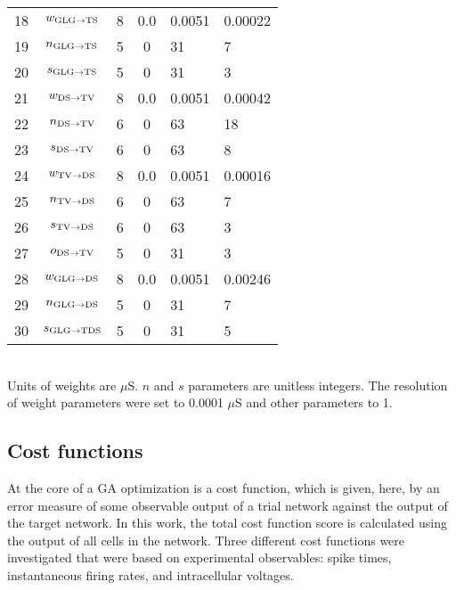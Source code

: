 \begin{table}[tp]
\begin{tabularx}{\textwidth}{lcccXX}
18 & $w_{{\rm GLG}\to {\rm TS}} $  &      8      & 0.0 &       0.0051        & 0.00022 \\ %
19 & $n_{{\rm GLG}\to {\rm TS}} $  &      5      &  0  &         31          & 7 \\ %
20 & $s_{{\rm GLG}\to {\rm TS}} $  &      5      &  0  &         31          & 3 \\   %
21 &  $w_{{\rm DS}\to {\rm TV}} $  &      8      & 0.0 &       0.0051        & 0.00042 \\ %
22 &  $n_{{\rm DS}\to {\rm TV}} $  &      6      &  0  &         63          & 18 \\ %
23 &  $s_{{\rm DS}\to {\rm TV}} $  &      6      &  0  &         63          & 8 \\   %
24 &  $w_{{\rm TV}\to {\rm DS}} $  &      8      & 0.0 &       0.0051        & 0.00016 \\ %
25 &  $n_{{\rm TV}\to {\rm DS}} $  &      6      &  0  &         63          & 7   \\ %
26 &  $s_{{\rm TV}\to {\rm DS}} $  &      6      &  0  &         63          & 3 \\   %
27 &  $o_{{\rm DS}\to {\rm TV}} $  &      5      &  0  &         31          & 3 \\ %
28 & $w_{{\rm GLG}\to {\rm DS}} $  &      8      & 0.0 &       0.0051        & 0.00246 \\   %
29 & $n_{{\rm GLG}\to {\rm DS}} $  &      5      &  0  &         31          & 7 \\ %
30 & $s_{{\rm GLG}\to {\rm TDS}} $ &      5      &  0  &         31          & 5 \\[0.5ex]\hline
\end{tabularx}\\
 \footnotesize{Units of weights are $\mu$S. $n$ and $s$ parameters are
   unitless integers. The resolution of weight parameters were set to
   0.0001 $\mu$S and other parameters to 1.}
\end{table}




\subsection{Cost functions}\label{sec:GA:cost-functions}

At the core of a GA optimization is a cost function, which is given,
here, by an error measure of some observable output of a trial network
against the output of the target network. In this work, the total cost
function score is calculated using the output of all cells in the
network.  Three different cost functions were investigated that were
based on experimental observables: spike times, instantaneous firing
rates, and intracellular voltages.


